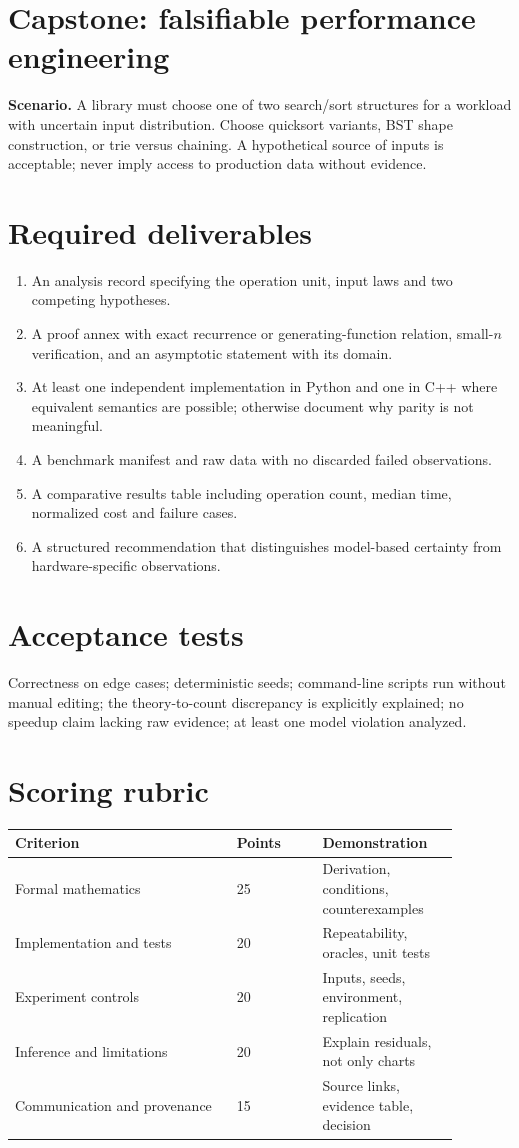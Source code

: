 \documentclass[11pt]{article}
\begin{document}
\makedoctocpage

\section{Capstone: falsifiable performance engineering}
\textbf{Scenario.} A library must choose one of two search/sort structures for a workload with uncertain input distribution. Choose quicksort variants, BST shape construction, or trie versus chaining. A hypothetical source of inputs is acceptable; never imply access to production data without evidence.
\section{Required deliverables}
\begin{enumerate}
\item An analysis record specifying the operation unit, input laws and two competing hypotheses.
\item A proof annex with exact recurrence or generating-function relation, small-$n$ verification, and an asymptotic statement with its domain.
\item At least one independent implementation in Python and one in C++ where equivalent semantics are possible; otherwise document why parity is not meaningful.
\item A benchmark manifest and raw data with no discarded failed observations.
\item A comparative results table including operation count, median time, normalized cost and failure cases.
\item A structured recommendation that distinguishes model-based certainty from hardware-specific observations.
\end{enumerate}
\section{Acceptance tests}
Correctness on edge cases; deterministic seeds; command-line scripts run without manual editing; the theory-to-count discrepancy is explicitly explained; no speedup claim lacking raw evidence; at least one model violation analyzed.
\section{Scoring rubric}
\begin{longtable}{p{0.44\linewidth}p{0.17\linewidth}p{0.27\linewidth}}\toprule Criterion & Points & Demonstration \\ \midrule
Formal mathematics & 25 & Derivation, conditions, counterexamples \\
Implementation and tests & 20 & Repeatability, oracles, unit tests \\
Experiment controls & 20 & Inputs, seeds, environment, replication \\
Inference and limitations & 20 & Explain residuals, not only charts \\
Communication and provenance & 15 & Source links, evidence table, decision \\
\bottomrule\end{longtable}
\end{document}
